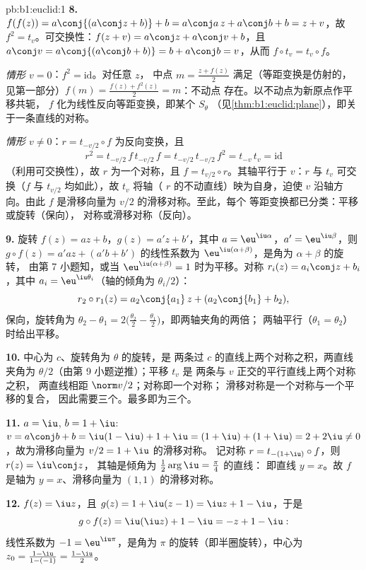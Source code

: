 \begin{solution}{pb:b1:euclid:1}
\textbf{8.} $f(f(z)) = a\conj{(a\conj z + b)} + b = a\conj a\,z
+ a\conj b + b = z + v$，故 $f^2 = t_v$。可交换性：$f(z + v) =
a\conj z + a\conj v + b$，且 $a\conj v = a\conj{(a\conj b + b)}
= b + a\conj b = v$，从而 $f\circ t_v = t_v\circ f$。

\emph{情形 $v = 0$}：$f^2 = \mathrm{id}$。对任意 $z$，
中点 $m = \frac{z + f(z)}2$ 满足（等距变换是仿射的，
见第一部分）$f(m) = \frac{f(z) + f^2(z)}{2} = m$：不动点
存在。以不动点为新原点作平移共轭，
$f$ 化为线性反向等距变换，即某个 $S_\theta$
（见\cref{thm:b1:euclid:plane}），即关于一条直线的对称。

\emph{情形 $v \neq 0$}：$r = t_{-v/2}\circ f$ 为反向变换，且
\[
r^2 = t_{-v/2}\,f\,t_{-v/2}\,f = t_{-v/2}\,t_{-v/2}\,f^2
= t_{-v}\,t_v = \mathrm{id}
\]
（利用可交换性），故 $r$ 为一个对称，且 $f =
t_{v/2}\circ r$。其轴平行于 $v$：$r$ 与
$t_v$ 可交换（$f$ 与 $t_{v/2}$ 均如此），故 $t_v$ 将轴（
$r$ 的不动直线）映为自身，迫使 $v$ 沿轴方向。由此
$f$ 是滑移向量为 $v/2$ 的滑移对称。至此，每个
等距变换都已分类：平移或旋转（保向），
对称或滑移对称（反向）。

\textbf{9.} 旋转 $f(z) = az + b$，$g(z) = a'z + b'$，其中
$a = \eu^{\iu\alpha}$，$a' = \eu^{\iu\beta}$，则 $g\circ f(z) =
a'az + (a'b + b')$ 的线性系数为
$\eu^{\iu(\alpha+\beta)}$，是角为 $\alpha + \beta$ 的旋转，
由第 7 小题知，或当 $\eu^{\iu(\alpha+\beta)} =
1$ 时为平移。对称 $r_i(z) = a_i\conj z + b_i$，其中 $a_i =
\eu^{\iu\theta_i}$（轴的倾角为 $\theta_i/2$）：
\[
r_2\circ r_1(z) = a_2\conj{a_1}\,z + (a_2\conj{b_1} + b_2),
\]
保向，旋转角为 $\theta_2 - \theta_1 = 2\bigl(\tfrac{\theta_2}2
- \tfrac{\theta_1}2\bigr)$，即两轴夹角的两倍；
两轴平行（$\theta_1 = \theta_2$）时给出平移。

\textbf{10.} 中心为 $c$、旋转角为 $\theta$ 的旋转，是
两条过 $c$ 的直线上两个对称之积，两直线夹角为
$\theta/2$（由第 9 小题逆推）；平移 $t_v$ 是
两条与 $v$ 正交的平行直线上两个对称之积，
两直线相距 $\norm v/2$；对称即一个对称；
滑移对称是一个对称与一个平移的复合，
因此需要三个。最多即为三个。

\textbf{11.} $a = \iu$, $b = 1 + \iu$: $v = a\conj b + b =
\iu(1 - \iu) + 1 + \iu = (1 + \iu) + (1 + \iu) = 2 + 2\iu \neq
0$，故为滑移向量为 $v/2 = 1 + \iu$ 的滑移对称。
记对称 $r = t_{-(1+\iu)}\circ f$，则 $r(z) = \iu\conj z$，
其轴是倾角为 $\frac12\arg\iu = \frac\pi4$ 的直线：
即直线 $y = x$。故 $f$ 是轴为 $y =
x$、滑移向量为 $(1, 1)$ 的滑移对称。

\textbf{12.} $f(z) = \iu z$，且 $g(z) = 1 + \iu(z - 1) = \iu z
+ 1 - \iu$，于是
\[
g\circ f(z) = \iu(\iu z) + 1 - \iu = -z + 1 - \iu :
\]
线性系数为 $-1 = \eu^{\iu\pi}$，是角为
$\pi$ 的旋转（即半圈旋转），中心为 $z_0 = \frac{1 - \iu}{1 - (-1)}
= \frac{1 - \iu}{2}$。


\end{solution}
